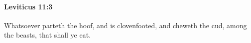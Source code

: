 
		\paragraph{Leviticus 11:3} %
			\label{LEVITICUS-11-3}

			Whatsoever parteth the hoof, and is clovenfooted, and cheweth the cud, among the beasts, that shall ye eat.


